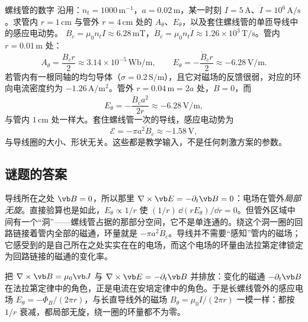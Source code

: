
\begin{example}{螺线管的数字}\label{ex:magnetic-solenoidE}
沿用：$n_t=1000\,\mathrm{m^{-1}}$，$a=0.02\,\mathrm m$，某一时刻 $I=5\,\mathrm A$、$\dot I=10^6\,\mathrm{A/s}$。求管内 $r=1\,\mathrm{cm}$ 与管外 $r=4\,\mathrm{cm}$ 处的 $A_\theta$、$E_\theta$，以及套住螺线管的单匝导线中的感应电动势。
\solution
$B_c=\mu_0n_tI\approx6.28\,\mathrm{mT}$，$\dot B_c=\mu_0n_t\dot I\approx1.26\times10^3\,\mathrm{T/s}$。管内 $r=0.01\,\mathrm m$ 处：
\begin{equation*}
A_\theta=\frac{B_cr}{2}\approx3.14\times10^{-5}\,\mathrm{Wb/m},\qquad E_\theta=-\frac{\dot B_cr}{2}\approx-6.28\,\mathrm{V/m}.
\end{equation*}
若管内有一根同轴的均匀导体（$\sigma=0.2\,\mathrm{S/m}$），且它对磁场的反馈很弱，对应的环向电流密度约为 $-1.26\,\mathrm{A/m^2}$。管外 $r=0.04\,\mathrm m=2a$ 处，$B=0$，而
\begin{equation*}
E_\theta=-\frac{\dot B_ca^2}{2r}\approx-6.28\,\mathrm{V/m},
\end{equation*}
与管内 $1\,\mathrm{cm}$ 处一样大。套住螺线管一次的导线，感应电动势为
\begin{equation*}
\mathcal E=-\pi a^2\dot B_c\approx-1.58\,\mathrm V,
\end{equation*}
与导线圈的大小、形状无关。这些都是教学输入，不是任何刺激方案的参数。
\end{example}

\subsection{谜题的答案}
导线所在之处 $\vb B=0$，所以那里 $\nabla\times\vb E=-\partial_t\vb B=0$：电场在管外\emph{局部无旋}。直接验算也是如此，$E_\theta\propto1/r$ 使 $(1/r)\,\dd(rE_\theta)/\dd r=0$。但管外区域中间有一个“洞”——螺线管占据的那部分空间，它不是单连通的。绕这个洞一圈的回路链接着管内全部的磁通，环量就是 $-\pi a^2\dot B_c$。导线并不需要“感知”管内的磁场；它感受到的是自己所在之处实实在在的电场，而这个电场的环量由法拉第定律锁定为回路链接的磁通的变化率。

\begin{intuition}
把 $\nabla\times\vb B=\mu_0\vb J$ 与 $\nabla\times\vb E=-\partial_t\vb B$ 并排放：变化的磁通 $-\partial_t\vb B$ 在法拉第定律中的角色，正是电流在安培定律中的角色。于是长螺线管外的感应电场 $E_\theta=-\dot\Phi_B/(2\pi r)$，与长直导线外的磁场 $B_\theta=\mu_0I/(2\pi r)$ 一模一样：都按 $1/r$ 衰减，都局部无旋，绕一圈的环量都不为零。
\end{intuition}


